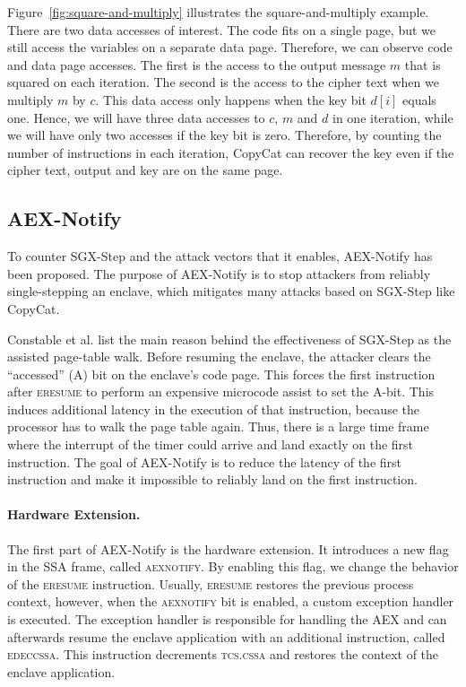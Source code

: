 \documentclass{llncs}
\begin{document}
Figure~\ref{fig:square-and-multiply} illustrates the square-and-multiply example.
There are two data accesses of interest. The code fits on a single page, but we still access the variables on a separate data page. Therefore, we can observe code and data page accesses.
The first is the access to the output message $m$ that is squared on each iteration.
The second is the access to the cipher text when we multiply $m$ by $c$.
This data access only happens when the key bit $d[i]$ equals one.
Hence, we will have three data accesses to $c$, $m$ and $d$ in one iteration,
while we will have only two accesses if the key bit is zero.
Therefore, by counting the number of instructions in each iteration,
CopyCat can recover the key even if the cipher text, output and key are on the same page.


\subsection{AEX-Notify}
\label{sec:aex-notify}

To counter SGX-Step and the attack vectors that it enables, AEX-Notify has been proposed.
The purpose of AEX-Notify is to stop attackers from reliably single-stepping an enclave,
which mitigates many attacks based on SGX-Step like CopyCat.

Constable et al. \cite{ConstableBCXXAK23} list the main reason
behind the effectiveness of SGX-Step as the assisted page-table walk.
Before resuming the enclave, the attacker clears
the ``accessed'' (A) bit on the enclave's code page.
This forces the first instruction after \textsc{eresume}
to perform an expensive microcode assist to set the A-bit.
This induces additional latency in the execution of that instruction, because
the processor has to walk the page table again.
Thus, there is a large time frame where the interrupt of the timer could
arrive and land exactly on the first instruction.
The goal of AEX-Notify is to reduce the latency of the first instruction
and make it impossible to reliably land on the first instruction.

\paragraph{Hardware Extension.}
The first part of AEX-Notify is the hardware extension.
It introduces a new flag in the SSA frame, called \textsc{aexnotify}.
By enabling this flag, we change the behavior of the \textsc{eresume} instruction.
Usually, \textsc{eresume} restores the previous process context,
however, when the \textsc{aexnotify} bit is enabled,
a custom exception handler is executed.
The exception handler is responsible for handling the AEX and
can afterwards resume the enclave application with an additional instruction, called \textsc{edeccssa}.
This instruction decrements \textsc{tcs.cssa} and restores the context of the enclave application.
\end{document}
